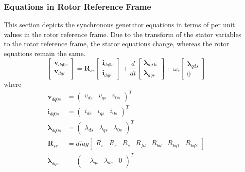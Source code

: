 \subsubsection{Equations in Rotor Reference Frame}
This section depicts the synchronous generator equations in terms of per unit values in the rotor reference frame. Due to the transform of the stator variables to the rotor reference frame, the stator equations change, whereas the rotor equations remain the same.
%
\begin{equation}
  \begin{bmatrix}
    \mathbf{v}_{dq0s} \\
    \mathbf{v}_{dqr}
  \end{bmatrix}
  =  
  \mathbf{R}_{sr}  
  \begin{bmatrix}
    \mathbf{i}_{dq0s} \\
    \mathbf{i}_{dqr}
  \end{bmatrix}
  +
  \frac{d}{dt}
  \begin{bmatrix}
    \boldsymbol{\lambda}_{dq0s} \\
    \boldsymbol{\lambda}_{dqr}
  \end{bmatrix}
  + \omega_r
  \begin{bmatrix}
    \boldsymbol{\lambda}_{qds} \\
    0
  \end{bmatrix}
\end{equation}
%
where
%
\begin{align}
  \mathbf{v}_{dq0s} &= 
  \begin{pmatrix}
    v_{ds} & v_{qs} & v_{0s}
  \end{pmatrix}^T \\
  \mathbf{i}_{dq0s} &= 
  \begin{pmatrix}
    i_{ds} & i_{qs} & i_{0s}
  \end{pmatrix}^T \\  
  \boldsymbol{\lambda}_{dq0s} &= 
  \begin{pmatrix}
    \lambda_{ds} & \lambda_{qs} & \lambda_{0s}
  \end{pmatrix}^T \\
  \mathbf{R}_{sr} &= diag
  \begin{bmatrix}
    R_s & R_s & R_s & R_{fd} & R_{kd} & R_{kq1} & R_{kq2} 
  \end{bmatrix} \\
  \boldsymbol{\lambda}_{dqs} &= 
  \begin{pmatrix}
    -\lambda_{qs} & \lambda_{ds} & 0
  \end{pmatrix}^T
\end{align}
